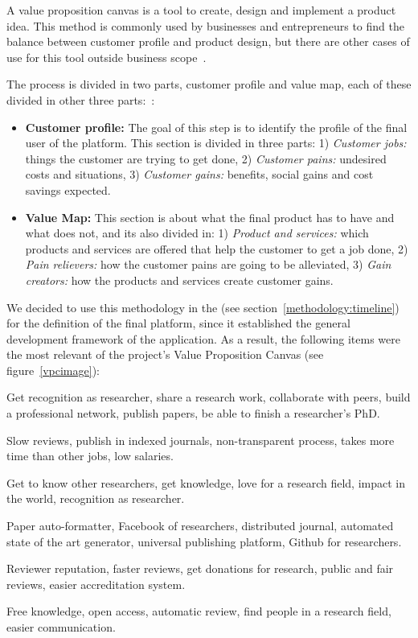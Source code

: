 
A value proposition canvas is a tool to create, design and implement a product
idea. This method is commonly used by businesses and entrepreneurs to find the
balance between customer profile and product design, but there are other cases
of use for this tool outside business
scope~\cite{pokorna2015value,meertens2012mapping}.

The process is divided in two parts, customer profile and value map, each of
these divided in other three parts:~\cite{osterwalder2014value}:

\begin{itemize}
\item \textbf{Customer profile:} The goal of this step is to identify the
  profile of the final user of the platform. This section is divided in three
  parts: 1) \emph{Customer jobs:} things the customer are trying to get done, 2)
  \emph{Customer pains:} undesired costs and situations, 3) \emph{Customer
    gains:} benefits, social gains and cost savings expected.
\item \textbf{Value Map:} This section is about what the final product has to
  have and what does not, and its also divided in: 1) \emph{Product and
    services:} which products and services are offered that help the customer to
  get a job done, 2) \emph{Pain relievers:} how the customer pains are going to
  be alleviated, 3) \emph{Gain creators:} how the products and services create
  customer gains.
\end{itemize}

We decided to use this methodology in the  (see
section~\ref{methodology:timeline}) for the definition of the final platform,
since it established the general development framework of the application. As a
result, the following items were the most relevant of the project's Value
Proposition Canvas (see figure~\ref{vpcimage}):

\begin{itemize}
   Get recognition as researcher, share a research work,
  collaborate with peers, build a professional network, publish papers, be able
  to finish a researcher's PhD.

   Slow reviews, publish in indexed journals,
  non-transparent process, takes more time than other jobs, low salaries.

   Get to know other researchers, get knowledge, love for
  a research field, impact in the world, recognition as researcher.

   Paper auto-formatter, Facebook of researchers,
  distributed journal, automated state of the art generator, universal
  publishing platform, Github for researchers.

   Reviewer reputation, faster reviews, get donations for
  research, public and fair reviews, easier accreditation system.

   Free knowledge, open access, automatic review, find
  people in a research field, easier communication.
\end{itemize}

